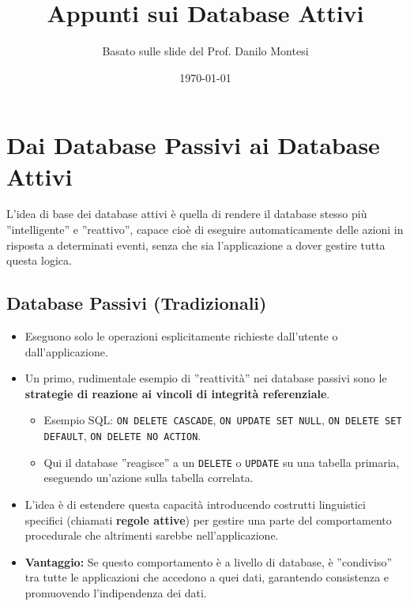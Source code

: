 \documentclass{article}
\title{Appunti sui Database Attivi}
\author{Basato sulle slide del Prof. Danilo Montesi}
\date{\today}
\begin{document}
	
	\maketitle
	\tableofcontents
	\newpage
	
	\section{Dai Database Passivi ai Database Attivi}
	L'idea di base dei database attivi è quella di rendere il database stesso più ''intelligente'' e ''reattivo'', capace cioè di eseguire automaticamente delle azioni in risposta a determinati eventi, senza che sia l'applicazione a dover gestire tutta questa logica.
	
	\subsection{Database Passivi (Tradizionali)}
	\begin{itemize}
		\item Eseguono solo le operazioni esplicitamente richieste dall'utente o dall'applicazione.
		\item Un primo, rudimentale esempio di ''reattività'' nei database passivi sono le \textbf{strategie di reazione ai vincoli di integrità referenziale}.
		\begin{itemize}
			\item Esempio SQL: \texttt{ON DELETE CASCADE}, \texttt{ON UPDATE SET NULL}, \texttt{ON DELETE SET DEFAULT}, \texttt{ON DELETE NO ACTION}.
			\item Qui il database ''reagisce'' a un \texttt{DELETE} o \texttt{UPDATE} su una tabella primaria, eseguendo un'azione sulla tabella correlata.
		\end{itemize}
		\item L'idea è di estendere questa capacità introducendo costrutti linguistici specifici (chiamati \textbf{regole attive}) per gestire una parte del comportamento procedurale che altrimenti sarebbe nell'applicazione.
		\item \textbf{Vantaggio:} Se questo comportamento è a livello di database, è ''condiviso'' tra tutte le applicazioni che accedono a quei dati, garantendo consistenza e promuovendo l'indipendenza dei dati.
	\end{itemize}
	
\end{document}
